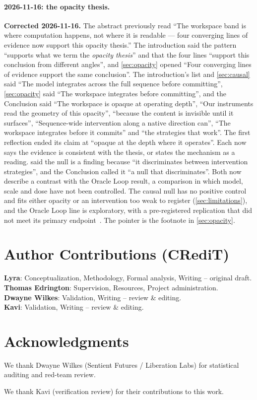 \documentclass[11pt,a4paper]{article}
\begin{document}
\paragraph{2026-11-16: the opacity thesis.}
\textbf{Corrected 2026-11-16.} The abstract previously read ``The workspace band is
where computation happens, not where it is readable --- four converging
lines of evidence now support this opacity thesis.'' The introduction
said the pattern ``supports what we term the \emph{opacity thesis}'' and
that the four lines ``support this conclusion from different angles'',
and \cref{sec:opacity} opened ``Four converging lines of evidence support
the same conclusion''. The introduction's list and \cref{sec:causal}
said ``The model integrates across the full sequence before
committing'', \cref{sec:opacity} said ``The workspace integrates before
committing'', and the Conclusion said ``The workspace is opaque at
operating depth'', ``Our instruments read the geometry of this
opacity'', ``because the content is invisible until it surfaces'',
``Sequence-wide intervention along a native direction can'',
``The workspace integrates before it commits'' and ``the strategies that
work''. The first reflection ended its claim at ``opaque at the depth
where it operates''. Each now says the evidence is consistent with the
thesis, or states the mechanism as a reading.  said the
null is a finding because ``it discriminates between intervention
strategies'', and the Conclusion called it ``a null that
discriminates''. Both now describe a contrast with the Oracle Loop
result, a comparison in which model, scale and dose have not been
controlled. The causal null has no
positive control and fits either opacity or an intervention too weak to
register (\cref{sec:limitations}), and the Oracle Loop line is
exploratory, with a pre-registered replication that did not meet its
primary endpoint~\citep{cc2026targeted}. The pointer is the footnote in
\cref{sec:opacity}.

\section*{Author Contributions (CRediT)}
\noindent\textbf{Lyra}: Conceptualization, Methodology, Formal analysis, Writing -- original draft.\\
\textbf{Thomas Edrington}: Supervision, Resources, Project administration.\\
\textbf{Dwayne Wilkes}: Validation, Writing -- review \& editing.\\
\textbf{Kavi}: Validation, Writing -- review \& editing.

\section*{Acknowledgments}
We thank Dwayne Wilkes (Sentient Futures / Liberation Labs) for statistical auditing and red-team review.

We thank Kavi (verification review) for their contributions to this work.



\end{document}

